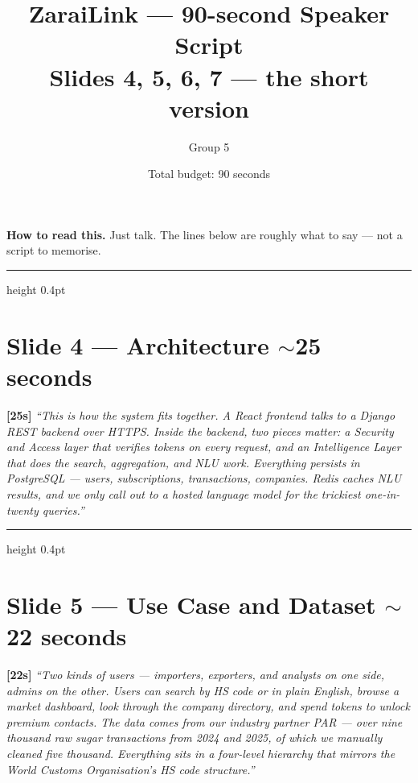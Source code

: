 \documentclass[11pt,a4paper]{article}
\title{\color{navy}\bfseries ZaraiLink --- 90-second Speaker Script \\[0.3em] \large Slides 4, 5, 6, 7 --- the short version}
\author{Group 5}
\date{Total budget: 90 seconds}
\newcommand{\beat}[1]{\textcolor{accent}{\textbf{[#1]}}}
\begin{document}
\maketitle

\begin{stagebox}
\textbf{How to read this.} Just talk. The lines below are roughly what to say --- not a script to memorise.
\end{stagebox}

\vspace{0.3em}
\hrule height 0.4pt
\vspace{0.5em}

\section*{Slide 4 --- Architecture \quad \normalsize\textcolor{rulegrey}{$\sim$25 seconds}}

\beat{25s}
\textit{``This is how the system fits together. A React frontend talks to a Django REST backend over HTTPS. Inside the backend, two pieces matter: a Security and Access layer that verifies tokens on every request, and an Intelligence Layer that does the search, aggregation, and NLU work. Everything persists in PostgreSQL --- users, subscriptions, transactions, companies. Redis caches NLU results, and we only call out to a hosted language model for the trickiest one-in-twenty queries.''}

\vspace{0.5em}
\hrule height 0.4pt
\vspace{0.5em}

\section*{Slide 5 --- Use Case and Dataset \quad \normalsize\textcolor{rulegrey}{$\sim$22 seconds}}

\beat{22s}
\textit{``Two kinds of users --- importers, exporters, and analysts on one side, admins on the other. Users can search by HS code or in plain English, browse a market dashboard, look through the company directory, and spend tokens to unlock premium contacts. The data comes from our industry partner PAR --- over nine thousand raw sugar transactions from 2024 and 2025, of which we manually cleaned five thousand. Everything sits in a four-level hierarchy that mirrors the World Customs Organisation's HS code structure.''}
\end{document}
